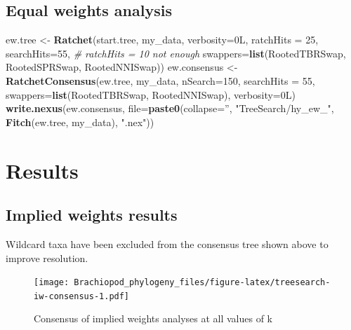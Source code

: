 \documentclass[openany]{book}
\newenvironment{Shaded}{\begin{snugshade}}{\end{snugshade}}
\newcommand{\KeywordTok}[1]{\textcolor[rgb]{0.13,0.29,0.53}{\textbf{#1}}}
\newcommand{\DataTypeTok}[1]{\textcolor[rgb]{0.13,0.29,0.53}{#1}}
\newcommand{\DecValTok}[1]{\textcolor[rgb]{0.00,0.00,0.81}{#1}}
\newcommand{\StringTok}[1]{\textcolor[rgb]{0.31,0.60,0.02}{#1}}
\newcommand{\CommentTok}[1]{\textcolor[rgb]{0.56,0.35,0.01}{\textit{#1}}}
\newcommand{\NormalTok}[1]{#1}
\theoremstyle{definition}
\theoremstyle{definition}
\theoremstyle{definition}
\theoremstyle{remark}
\begin{document}
\hypertarget{equal-weights-analysis}{%
\subsection{Equal weights analysis}\label{equal-weights-analysis}}

\begin{Shaded}
\begin{Highlighting}[]
\NormalTok{ew.tree <-}\StringTok{ }\KeywordTok{Ratchet}\NormalTok{(start.tree, my_data, }\DataTypeTok{verbosity=}\NormalTok{0L,}
                   \DataTypeTok{ratchHits =} \DecValTok{25}\NormalTok{, }\DataTypeTok{searchHits=}\DecValTok{55}\NormalTok{, }\CommentTok{# ratchHits = 10 not enough}
                   \DataTypeTok{swappers=}\KeywordTok{list}\NormalTok{(RootedTBRSwap, RootedSPRSwap, RootedNNISwap))}
\NormalTok{ew.consensus <-}\StringTok{ }\KeywordTok{RatchetConsensus}\NormalTok{(ew.tree, my_data, }\DataTypeTok{nSearch=}\DecValTok{150}\NormalTok{, }\DataTypeTok{searchHits =} \DecValTok{55}\NormalTok{,}
                                 \DataTypeTok{swappers=}\KeywordTok{list}\NormalTok{(RootedTBRSwap, RootedNNISwap),}
                                 \DataTypeTok{verbosity=}\NormalTok{0L)}
\KeywordTok{write.nexus}\NormalTok{(ew.consensus, }\DataTypeTok{file=}\KeywordTok{paste0}\NormalTok{(}\DataTypeTok{collapse=}\StringTok{''}\NormalTok{, }\StringTok{"TreeSearch/hy_ew_"}\NormalTok{,}
                                      \KeywordTok{Fitch}\NormalTok{(ew.tree, my_data), }\StringTok{".nex"}\NormalTok{))}
\end{Highlighting}
\end{Shaded}

\hypertarget{results}{%
\section{Results}\label{results}}

\hypertarget{implied-weights-results}{%
\subsection{Implied weights results}\label{implied-weights-results}}

Wildcard taxa have been excluded from the consensus tree shown above to
improve resolution.

\begin{figure}
\centering
\texttt{[image: Brachiopod\_phylogeny\_files/figure-latex/treesearch-iw-consensus-1.pdf]}
\caption{\label{fig:treesearch-iw-consensus}Consensus of implied weights
analyses at all values of k}
\end{figure}
\end{document}
